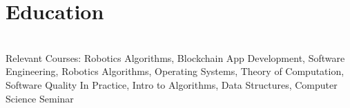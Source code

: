 \documentclass[]{deedy-resume-openfont}
\begin{document}
    
%
%
%
%
\section{Education}
\raggedright

\hfill {}\\
Relevant Courses: Robotics Algorithms, Blockchain App Development, Software Engineering, Robotics Algorithms, Operating Systems, Theory of Computation, Software Quality In Practice, Intro to Algorithms, Data Structures, Computer Science Seminar 
\sectionsep \\

\hfill {}\\
\sectionsep
%
%
\end{document}
